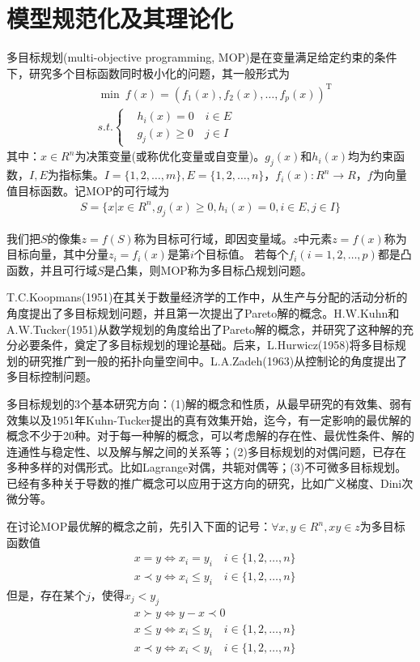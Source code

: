 \section{模型规范化及其理论化}
    \par
    多目标规划(multi-objective programming, MOP)是在变量满足给定约束的条件下，研究多个目标函数同时极小化的问题，其一般形式为
    \begin{align*}
    &\mathop {\min}\  f(x)=(f_1(x),f_2(x),\ldots,f_p(x))^\mathrm{T} \\
    &s.t.\left\{
    \begin{aligned}
    &h_i(x) = 0 \quad i \in E\\
    & g_j(x) \geqslant 0 \quad j \in I
    \end{aligned}
    \right.
    \end{align*}
    其中：$x \in R^n$为决策变量(或称优化变量或自变量)。$g_j(x)$和$h_i(x)$均为约束函数，$I,E$为指标集。$I=\{1,2,\ldots,m\},E=\{1,2,\ldots,n\}$，$f_i(x):R^n \to R$，$f$为向量值目标函数。记MOP的可行域为
    \begin{align*}
    S=\{x|x \in R^n,g_j(x)\geqslant 0,h_i(x)=0,i \in E,j \in I\}
    \end{align*}
    \par
    我们把$S$的像集$z=f(S)$称为目标可行域，即因变量域。$z$中元素$z=f(x)$称为目标向量，其中分量$z_i=f_i(x)$是第$i$个目标值。
    若每个$f_i(i=1,2,\ldots,p)$都是凸函数，并且可行域$S$是凸集，则MOP称为多目标凸规划问题。
    \par
    T.C.Koopmans(1951)在其关于数量经济学的工作中，从生产与分配的活动分析的角度提出了多目标规划问题，并且第一次提出了Pareto解的概念。H.W.Kuhn和A.W.Tucker(1951)从数学规划的角度给出了Pareto解的概念，并研究了这种解的充分必要条件，奠定了多目标规划的理论基础。后来，L.Hurwicz(1958)将多目标规划的研究推广到一般的拓扑向量空间中。L.A.Zadeh(1963)从控制论的角度提出了多目标控制问题。
    \par
    多目标规划的3个基本研究方向：(1)解的概念和性质，从最早研究的有效集、弱有效集以及1951年Kuhn-Tucker提出的真有效集开始，迄今，有一定影响的最优解的概念不少于20种。对于每一种解的概念，可以考虑解的存在性、最优性条件、解的连通性与稳定性、以及解与解之间的关系等；(2)多目标规划的对偶问题，已存在多种多样的对偶形式。比如Lagrange对偶，共轭对偶等；(3)不可微多目标规划。已经有多种关于导数的推广概念可以应用于这方向的研究，比如广义梯度、Dini次微分等。
    \par
    在讨论MOP最优解的概念之前，先引入下面的记号：$\forall x,y \in R^n,xy \in z$为多目标函数值
    \begin{align*}
      & x=y \Leftrightarrow x_i=y_i \quad i \in \{1,2,\ldots,n\}\\
      & x \prec y \Leftrightarrow x_i \leqslant y_i \quad i \in \{1,2,\ldots,n\}
    \end{align*}
    但是，存在某个$j$，使得$x_j<y_j$
    \begin{align*}
      & x\succ y \Leftrightarrow y-x \prec 0\\
      & x \leqslant y \Leftrightarrow x_i \leqslant y_i \quad i \in \{1,2,\ldots,n\}\\
      & x\prec y \Leftrightarrow x_i < y_i \quad i \in \{1,2,\ldots,n\}
    \end{align*}
